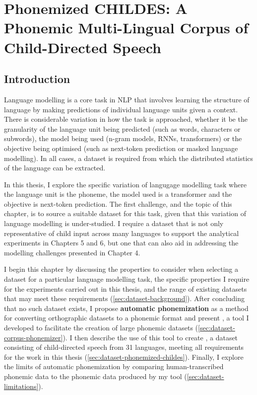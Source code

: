 \chapter{Phonemized CHILDES: A Phonemic Multi-Lingual Corpus of Child-Directed Speech}


\section{Introduction}
\label{sec:dataset-intro}

Language modelling is a core task in NLP that involves learning the structure of language by making predictions of individual language units given a context. There is considerable variation in how the task is approached, whether it be the granularity of the language unit being predicted (such as words, characters or subwords), the model being used (n-gram models, RNNs, transformers) or the objective being optimised (such as next-token prediction or masked language modelling). In all cases, a dataset is required from which the distributed statistics of the language can be extracted.

In this thesis, I explore the specific variation of langugage modelling task where the language unit is the phoneme, the model used is a transformer and the objective is next-token prediction. The first challenge, and the topic of this chapter, is to source a suitable dataset for this task, given that this variation of language modelling is under-studied. I require a dataset that is not only representative of child input across many languages to support the analytical experiments in Chapters 5 and 6, but one that can also aid in addressing the modelling challenges presented in Chapter 4. 

I begin this chapter by discussing the properties to consider when selecting a dataset for a particular language modelling task, the specific properties I require for the experiments carried out in this thesis, and the range of existing datasets that may meet these requirements (\cref{sec:dataset-background}). After concluding that no such dataset exists, I propose \textbf{automatic phonemization} as a method for converting orthographic datasets to a phonemic format and present \corpusphonemizer, a tool I developed to facilitate the creation of large phonemic datasets (\cref{sec:dataset-corpus-phonemizer}). I then describe the use of this tool to create \phonemizedchildes, a dataset consisting of child-directed speech from 31 languages, meeting all requirements for the work in this thesis (\cref{sec:dataset-phonemized-childes}). Finally, I explore the limits of automatic phonemization by comparing human-transcribed phonemic data to the phonemic data produced by my tool (\cref{sec:dataset-limitations}).

